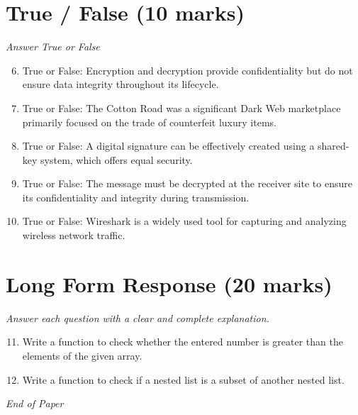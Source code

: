 \documentclass[12pt]{article}
\begin{document}
\section*{True / False (10 marks)}
\textit{Answer True or False}
\begin{enumerate}[label=\arabic*.]
\setcounter{enumi}{5}
\item True or False: Encryption and decryption provide confidentiality but do not ensure data integrity throughout its lifecycle.
\item True or False: The Cotton Road was a significant Dark Web marketplace primarily focused on the trade of counterfeit luxury items.
\item True or False: A digital signature can be effectively created using a shared-key system, which offers equal security.
\item True or False: The message must be decrypted at the receiver site to ensure its confidentiality and integrity during transmission.
\item True or False: Wireshark is a widely used tool for capturing and analyzing wireless network traffic.
\end{enumerate}

\section*{Long Form Response (20 marks)}
\textit{Answer each question with a clear and complete explanation.}
\begin{enumerate}[label=\arabic*.]
\setcounter{enumi}{10}
\item Write a function to check whether the entered number is greater than the elements of the given array.
\item Write a function to check if a nested list is a subset of another nested list.
\end{enumerate}

\vfill
\noindent\textit{End of Paper}
\end{document}
